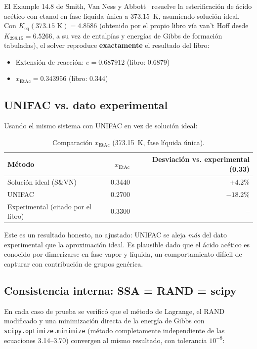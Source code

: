 \documentclass[11pt,a4paper]{article}
\begin{document}
El Example 14.8 de Smith, Van Ness y Abbott~\citep{smithvannessabbott}
resuelve la esterificación de ácido acético con etanol en fase líquida
única a 373.15~K, asumiendo solución ideal. Con $K_{\text{eq}}(373.15\text{ K})=4.8586$
(obtenido por el propio libro vía van't Hoff desde
$K_{298.15}=6.5266$, a su vez de entalpías y energías de Gibbs de
formación tabuladas), el solver reproduce \textbf{exactamente} el
resultado del libro:
\begin{itemize}
  \item Extensión de reacción: $e = 0.687912$ (libro: 0.6879)
  \item $x_{\text{EtAc}} = 0.343956$ (libro: 0.344)
\end{itemize}

\subsection{UNIFAC vs. dato experimental}

Usando el mismo sistema con UNIFAC en vez de solución ideal:

\begin{table}[h]
\centering
\caption{Comparación $x_{\text{EtAc}}$ (373.15~K, fase líquida única).}
\begin{tabular}{@{}lrr@{}}
\toprule
Método & $x_{\text{EtAc}}$ & Desviación vs. experimental (0.33) \\
\midrule
Solución ideal (S\&VN) & 0.3440 & $+4.2\%$ \\
UNIFAC & 0.2700 & $-18.2\%$ \\
Experimental (citado por el libro) & 0.3300 & -- \\
\bottomrule
\end{tabular}
\end{table}

Este es un resultado honesto, no ajustado: UNIFAC se aleja \emph{más}
del dato experimental que la aproximación ideal. Es plausible dado que
el ácido acético es conocido por dimerizarse en fase vapor y líquida,
un comportamiento difícil de capturar con contribución de grupos
genérica.

\subsection{Consistencia interna: SSA = RAND = scipy}

En cada caso de prueba se verificó que el método de Lagrange, el RAND
modificado y una minimización directa de la energía de Gibbs con
\texttt{scipy.optimize.minimize} (método completamente independiente de
las ecuaciones 3.14--3.70) convergen al mismo resultado, con tolerancia
$10^{-8}$:
\end{document}
